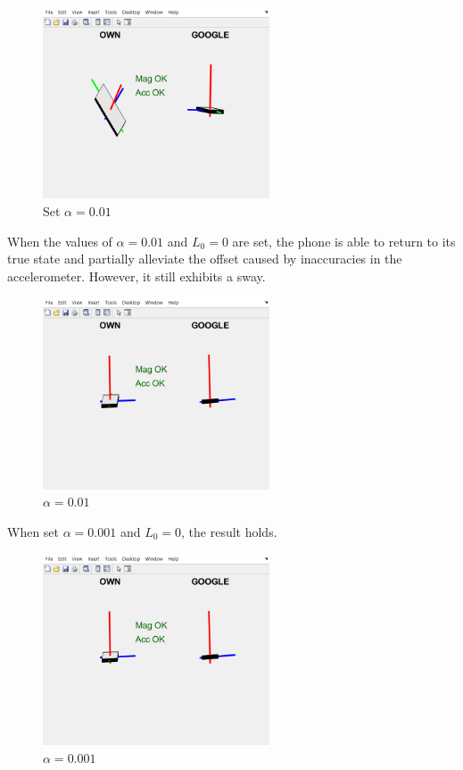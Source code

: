 \begin{figure}[H]
 \centering
 \includegraphics[width=0.6\textwidth]{images/alpha01.png}
 \caption{Set $ \alpha = 0.01 $}
 \label{alpha01}
\end{figure}


When the values of $ \alpha = 0.01 $ and $ L_0 = 0 $ are set, the phone is able to return to its true state and partially alleviate the offset caused by inaccuracies in the accelerometer. However, it still exhibits a sway.

\begin{figure}[H]
 \centering
 \includegraphics[width=0.6\textwidth]{images/alpha001.png}
 \caption{$ \alpha = 0.01 $}
 \label{alpha001}
\end{figure}

When set  $ \alpha = 0.001 $ and $ L_0 = 0 $, the result holds.

\begin{figure}[H]
 \centering
 \includegraphics[width=0.6\textwidth]{images/alpha0.01.png}
 \caption{$ \alpha = 0.001 $}
 \label{alpha0001}
\end{figure}

